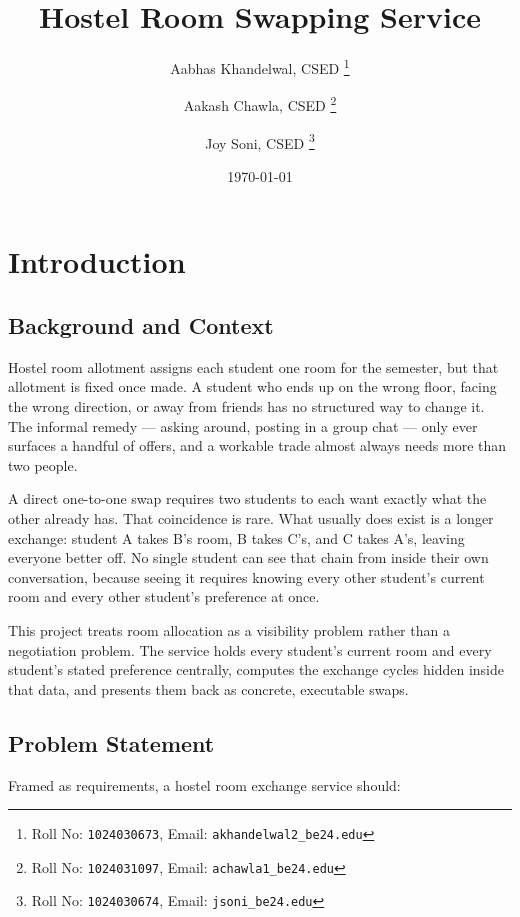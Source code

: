 \documentclass[11pt,a4paper]{report}
\title{Hostel Room Swapping Service}
\author{
  Aabhas Khandelwal, CSED%
  \thanks{Roll No: \texttt{1024030673}, %
    Email: \texttt{akhandelwal2\_be24\@thapar.edu}}
  \and
  Aakash Chawla, CSED%
  \thanks{Roll No: \texttt{1024031097}, %
    Email: \texttt{achawla1\_be24\@thapar.edu}}
  \and
  Joy Soni, CSED%
  \thanks{Roll No: \texttt{1024030674}, %
    Email: \texttt{jsoni\_be24\@thapar.edu}}
}
\date{\today}
\begin{document}
\maketitle
\tableofcontents


\chapter{Introduction}

\section{Background and Context}

Hostel room allotment assigns each student one room for the semester,
but that allotment is fixed once made. A student who ends up on the
wrong floor, facing the wrong direction, or away from friends has no
structured way to change it. The informal remedy --- asking around,
posting in a group chat --- only ever surfaces a handful of offers,
and a workable trade almost always needs more than two people.

A direct one-to-one swap requires two students to each want exactly
what the other already has. That coincidence is rare. What usually
does exist is a longer exchange: student A takes B's room, B takes
C's, and C takes A's, leaving everyone better off. No single student
can see that chain from inside their own conversation, because seeing
it requires knowing every other student's current room and every
other student's preference at once.

This project treats room allocation as a visibility problem rather
than a negotiation problem. The service holds every student's current
room and every student's stated preference centrally, computes the
exchange cycles hidden inside that data, and presents them back as
concrete, executable swaps.

\section{Problem Statement}

Framed as requirements, a hostel room exchange service should:
\end{document}
